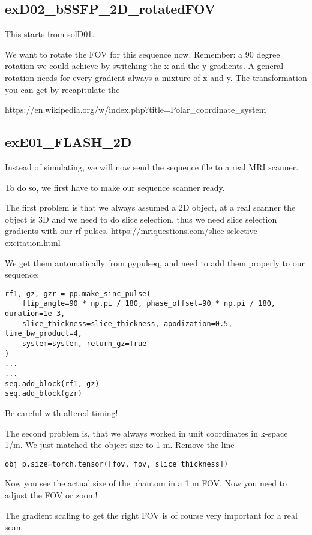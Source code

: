 \documentclass[a4paper,12pt]{extarticle}
\begin{document}
\subsection{exD02\_bSSFP\_2D\_rotatedFOV}
This starts from solD01.

We want to rotate the FOV for this sequence now.
Remember: a 90 degree rotation we could achieve by switching the x and the y gradients.
A general rotation needs for every gradient always a mixture of x and y.
The transformation you can get by recapitulate the 

https://en.wikipedia.org/w/index.php?title=Polar\_coordinate\_system


\subsection{exE01\_FLASH\_2D}
Instead of simulating, we will now send the sequence file to a real MRI scanner.

To do so, we first have to make our sequence scanner ready.

The first problem is that we always assumed a 2D object, at a real scanner the object is 3D and we need to do slice selection, thus we need slice selection gradients with our rf pulses.
https://mriquestions.com/slice-selective-excitation.html 

We get them automatically from pypulseq, and need to add them properly to our sequence:
\begin{verbatim}
rf1, gz, gzr = pp.make_sinc_pulse(
    flip_angle=90 * np.pi / 180, phase_offset=90 * np.pi / 180, duration=1e-3,
    slice_thickness=slice_thickness, apodization=0.5, time_bw_product=4,
    system=system, return_gz=True
)
...
...
seq.add_block(rf1, gz)
seq.add_block(gzr)
\end{verbatim}
Be careful with altered timing!


The second problem is, that we always worked in unit coordinates in k-space 1/m.
We just matched the object size to 1 m.
Remove the line
\begin{verbatim}
obj_p.size=torch.tensor([fov, fov, slice_thickness]) 
\end{verbatim}
Now you see the actual size of the phantom in a 1 m FOV. Now you need to adjust the FOV or zoom!

The gradient scaling to get the right FOV is of course very important for a real scan.
\end{document}
